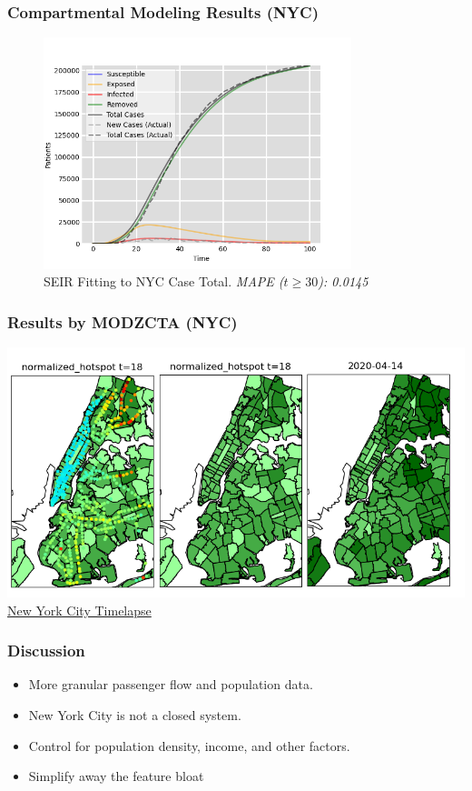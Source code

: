\documentclass{beamer}
\begin{document}
\begin{frame}
\frametitle{Compartmental Modeling Results (NYC)}
\begin{figure}
\includegraphics[width=0.8\textwidth]{Scratch_Visuals/SEIR_Curve_NYC_3.png}
\caption{SEIR Fitting to NYC Case Total. \textit{MAPE ($t \geq 30$): 0.0145}}
\end{figure}
\end{frame}
\begin{frame}
\frametitle{Results by MODZCTA (NYC)}
\includegraphics[width=1.0\textwidth]{Scratch_Visuals/NYC_Geo_Fitting.png}
\href{https://github.com/cheung-ho-lum/NS_Epidemics_ABM_Approach/blob/master/Repository/Visualizations/infection_timelapse_NYC_3.gif}{New York City Timelapse}
\end{frame}
\begin{frame}
\frametitle{Discussion}
\begin{itemize}
    \item More granular passenger flow and population data.
    \item New York City is not a closed system.
    \item Control for population density, income, and other factors.
    \item Simplify away the feature bloat
\end{itemize}
\end{frame}
\end{document}
